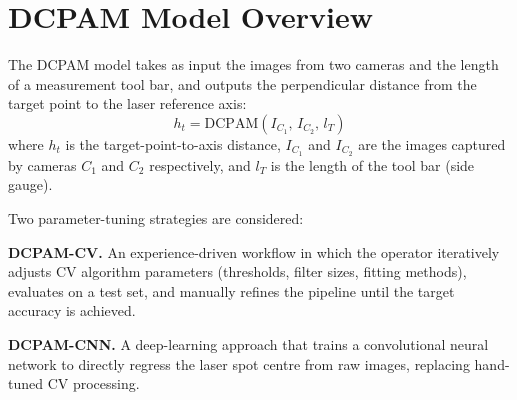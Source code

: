\section{DCPAM Model Overview}

The DCPAM model takes as input the images from two cameras and
the length of a measurement tool bar, and outputs the
perpendicular distance from the target point to the laser
reference axis:
%
\begin{equation}
  \boxed{h_t = \mathrm{DCPAM}(I_{C_1},\, I_{C_2},\, l_T)}
  \label{eq:dcpam-overview}
\end{equation}
%
where $h_t$ is the target-point-to-axis distance,
$I_{C_1}$ and $I_{C_2}$ are the images captured by cameras
$C_1$ and $C_2$ respectively,
and $l_T$ is the length of the tool bar (side gauge).

Two parameter-tuning strategies are considered:

\textbf{DCPAM-CV.}
An experience-driven workflow in which the operator
iteratively adjusts CV algorithm parameters
(thresholds, filter sizes, fitting methods),
evaluates on a test set, and manually refines the
pipeline until the target accuracy is achieved.

\textbf{DCPAM-CNN.}
A deep-learning approach that trains a convolutional
neural network to directly regress the laser spot
centre from raw images, replacing hand-tuned CV
processing.


